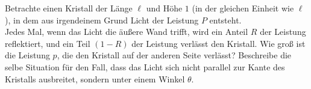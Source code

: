\begin{Exercise}[label = cristall, title = Relexion im Kristall, difficulty = 3, origin = Aaron Wild]
	Betrachte einen Kristall der Länge $\ell$ und Höhe $1$ (in der gleichen Einheit wie $\ell$), in dem aus irgendeinem Grund Licht der Leistung $P$ entsteht.\\
	\Question
	Jedes Mal, wenn das Licht die äußere Wand trifft, wird ein Anteil $R$ der Leistung reflektiert, und ein Teil $(1-R)$ der Leistung verlässt den Kristall. Wie groß ist die Leistung $p$, die den Kristall auf der anderen Seite verlässt?
	\Question Beschreibe die selbe Situation für den Fall, dass das Licht sich nicht parallel zur Kante des Kristalls ausbreitet, sondern unter einem Winkel $\theta$.

\end{Exercise}
\begin{figure}[h]
	\centering
{}
\end{figure}
